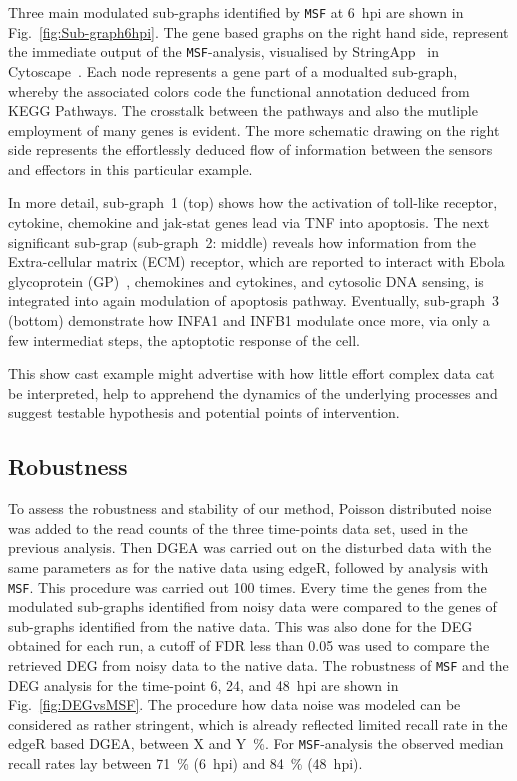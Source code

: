 \documentclass[10pt,a4paper,twocolumn]{article}
\newcommand{\TODO}[1]{\begingroup\color{red}#1\endgroup}
\begin{document}
 Three main modulated sub-graphs identified by \texttt{MSF} at 6~hpi
 are shown in Fig.~\ref{fig:Sub-graph6hpi}. The gene based graphs on
 the right hand side, represent the immediate output of the
 \texttt{MSF}-analysis, visualised by StringApp~\cite{StringApp} in
 Cytoscape~\cite{Cyto}. Each node represents a gene part of a
 modualted sub-graph, whereby the associated colors code the
 functional annotation deduced from KEGG Pathways. The crosstalk
 between the pathways and also the mutliple employment of many genes
 is evident. The more schematic drawing on the right side represents
 the effortlessly deduced flow of information between the sensors and
 effectors in this particular example.

 In more detail, sub-graph~1 (top) shows how the activation of
 toll-like receptor, cytokine, chemokine and jak-stat genes lead via
 TNF into apoptosis. The next significant sub-grap (sub-graph~2:
 middle) reveals how information from the Extra-cellular matrix (ECM)
 receptor, which are reported to interact with Ebola glycoprotein
 (GP)~\cite{Veljkovic}, chemokines and cytokines, and cytosolic DNA
 sensing, is integrated into again modulation of apoptosis
 pathway. Eventually, sub-graph~3 (bottom) demonstrate how INFA1 and
 INFB1 modulate once more, via only a few intermediat steps, the
 aptoptotic response of the cell.

 This show cast example might advertise with how little effort complex
 data cat be interpreted, help to apprehend the dynamics of the
 underlying processes and suggest testable hypothesis and potential
 points of intervention.
 
 \subsection*{Robustness}
 
 To assess the robustness and stability of our method, Poisson
 distributed noise was added to the read counts of the three
 time-points data set, used in the previous analysis. Then DGEA was
 carried out on the disturbed data with the same parameters as for the
 native data using edgeR, followed by analysis with \texttt{MSF}. This
 procedure was carried out 100 times.  Every time the genes from the
 modulated sub-graphs identified from noisy data were compared to the
 genes of sub-graphs identified from the native data. This was also
 done for the DEG obtained for each run, a cutoff of FDR less than
 0.05 was used to compare the retrieved DEG from noisy data to the
 native data.  The robustness of \texttt{MSF} and the DEG analysis for
 the time-point 6, 24, and 48~hpi are shown in
 Fig.~\ref{fig:DEGvsMSF}. The procedure how data noise was modeled can
 be considered as rather stringent, which is already reflected limited
 recall rate in the edgeR based DGEA, between \TODO{X and Y~\%}. For
 \texttt{MSF}-analysis the observed median recall rates lay between
 71~\% (6~hpi) and 84~\% (48~hpi).
\end{document}
